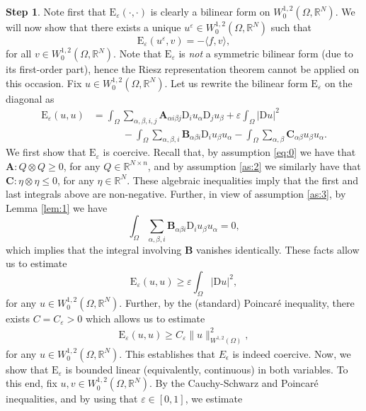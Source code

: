 \documentclass{amsart}
\numberwithin{equation}{section}
\numberwithin{thm}{section}
\theoremstyle{definition}
\newtheorem{proofpart}{Step}
\def\R{\mathbb{R}}
\def\Om{\Omega}
\renewcommand{\:}{\!:\!} %
\newcommand{\e}{\varepsilon}
\newcommand{\ot}{\otimes}
\newcommand{\by}{\times}
\renewcommand{\^}[1]{^{#1}_{\phantom{l}}}
\begin{document}
\begin{proofpart}
Note first that $\mathrm{E}_\e(\cdot, \cdot)$ is clearly a bilinear form on $W^{1,2}_0(\Omega, \R^N)$. We will now show that there exists a unique $u^\varepsilon \in W^{1,2}_0(\Omega, \mathbb{R}^N)$ such that 
\[
\mathrm{E}_\e(u^\e, v) = -\langle f,v \rangle,
\]
for all $v \in W^{1,2}_0(\Omega, \R^N)$. Note that $\mathrm{E}_\e$ is {\it not} a symmetric bilinear form (due to its first-order part), hence the Riesz representation theorem cannot be applied on this occasion. Fix $u \in W^{1,2}_0(\Om,\R^N)$. Let us rewrite the bilinear form $\mathrm{E}_\e$ on the diagonal as
\begin{align*}
\mathrm{E}_\e(u, u) &= \int_{\Omega} \sum_{\alpha,\beta, i, j} \mathbf{A}_{\alpha i \beta j}\mathrm{D}_{i}u_{\alpha}\mathrm{D}_{j}u_{\beta} +\varepsilon \int_{\Omega} \lvert \mathrm{D}u \rvert ^2  
\\ 
&\qquad\quad - \int_{\Omega}  \sum_{\alpha, \beta, i} \mathbf{B}_{\alpha \beta i}\mathrm{D}_{i}u_{\beta}u_{\alpha} - \int_{\Omega}  \sum_{\alpha, \beta} \mathbf{C}_{\alpha \beta}u_{\beta}u_{\alpha}.
\end{align*}
We first show that $\mathrm{E}_\e$ is coercive. Recall that, by assumption \eqref{eq:0} we have that $\mathbf{A}:Q\ot Q \geq 0$, for any $Q\in \R^{N\by n}$, and by assumption \eqref{as:2} we similarly have that $\mathbf{C}:\eta\ot \eta \leq 0$, for any $\eta \in \R^N$. These algebraic inequalities imply that the first and last integrals above are non-negative. Further, in view of assumption \eqref{as:3}, by Lemma \ref{lem:1} we have
\[
\int_{\Omega}  \sum_{\alpha, \beta, i} \mathbf{B}_{\alpha \beta i}\mathrm{D}_{i}u_{\beta}u_{\alpha} = 0,
\]
which implies that the integral involving $\mathbf{B}$ vanishes identically. These facts allow us to estimate
\[
\mathrm{E}_\e(u, u) \geq \varepsilon \int_{\Omega} \lvert \mathrm{D}u \rvert ^2 ,
\]
for any $u \in W^{1,2}_0(\Om,\R^N)$. Further, by the (standard) Poincar\'e inequality, there exists $C=C_\e>0$ which allows us to estimate
\begin{align}
\mathrm{E}_\e(u, u) \geq C_\e \| u \| ^2_{W^{1,2}(\Omega)}, \nonumber
\end{align}
for any $u \in W^{1,2}_0(\Om,\R^N)$. This establishes that $E_{\epsilon}$ is indeed coercive. Now, we show that $\mathrm{E}_\e$ is bounded linear (equivalently, continuous) in both variables. To this end, fix $u,v \in W^{1,2}_0(\Om,\R^N)$. By the Cauchy-Schwarz and Poincar\'e inequalities, and by using that $\e \in [0,1]$, we estimate
\begin{align}

\end{align}
\end{proofpart}
\end{document}

